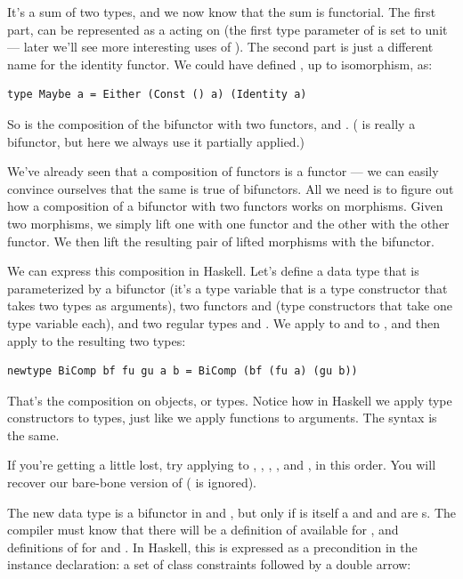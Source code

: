 It's a sum of two types, and we now know that the sum is functorial. The
first part,  can be represented as a 
acting on  (the first type parameter of  is set
to unit --- later we'll see more interesting uses of ).
The second part is just a different name for the identity functor. We
could have defined , up to isomorphism, as:

\begin{verbatim}
type Maybe a = Either (Const () a) (Identity a)
\end{verbatim}

So  is the composition of the bifunctor 
with two functors,  and .
( is really a bifunctor, but here we always use it
partially applied.)

We've already seen that a composition of functors is a functor --- we
can easily convince ourselves that the same is true of bifunctors. All
we need is to figure out how a composition of a bifunctor with two
functors works on morphisms. Given two morphisms, we simply lift one
with one functor and the other with the other functor. We then lift the
resulting pair of lifted morphisms with the bifunctor.

We can express this composition in Haskell. Let's define a data type
that is parameterized by a bifunctor  (it's a type variable
that is a type constructor that takes two types as arguments), two
functors  and  (type constructors that take one
type variable each), and two regular types  and . We
apply  to  and  to , and then
apply  to the resulting two types:

\begin{verbatim}
newtype BiComp bf fu gu a b = BiComp (bf (fu a) (gu b))
\end{verbatim}

That's the composition on objects, or types. Notice how in Haskell we
apply type constructors to types, just like we apply functions to
arguments. The syntax is the same.

If you're getting a little lost, try applying  to
, , , , and
, in this order. You will recover our bare-bone version of
 ( is ignored).

The new data type  is a bifunctor in  and
, but only if  is itself a  and
 and  are s. The compiler must
know that there will be a definition of  available for
, and definitions of  for  and
. In Haskell, this is expressed as a precondition in the
instance declaration: a set of class constraints followed by a double
arrow:


